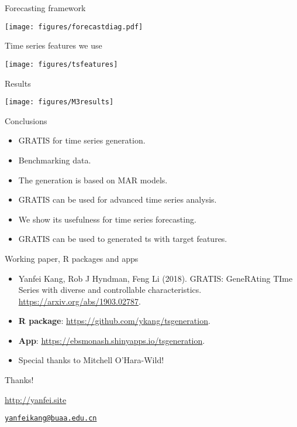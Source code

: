 \documentclass[12pt,ignorenonframetext,compress]{beamer}
\providecommand{\tightlist}{%
  \setlength{\itemsep}{0pt}\setlength{\parskip}{0pt}}
\begin{document}
\begin{frame}{Forecasting framework}
\protect\hypertarget{application-to-m3}{}

\centerline{\texttt{[image: figures/forecastdiag.pdf]}}

\end{frame}

\begin{frame}{Time series features we use}
\protect\hypertarget{time-series-features-we-use}{}

\centerline{\texttt{[image: figures/tsfeatures]}}

\end{frame}



\begin{frame}{Results}
\protect\hypertarget{results}{}

\centerline{\texttt{[image: figures/M3results]}}

\end{frame}

\begin{frame}{Conclusions}
\protect\hypertarget{conclusions}{}

\begin{itemize}
\tightlist
\item
  GRATIS for time series generation.
\item
  Benchmarking data.
\item
  The generation is based on MAR models.
\item
  GRATIS can be used for advanced time series analysis.
\item
  We show its usefulness for time series forecasting.
\item
  GRATIS can be used to generated ts with target features.
\end{itemize}

\end{frame}


\begin{frame}{Working paper, R packages and apps}
\protect\hypertarget{r-packages-and-apps}{}

\begin{itemize}
\tightlist
\item
  Yanfei Kang, Rob J Hyndman, Feng Li (2018). GRATIS: GeneRAting TIme
  Series with diverse and controllable characteristics.
  \url{https://arxiv.org/abs/1903.02787}.

\item
  \textbf{R package}: \url{https://github.com/ykang/tsgeneration}.
\item
  \textbf{App}: \url{https://ebsmonash.shinyapps.io/tsgeneration}.
\item
  Special thanks to Mitchell O'Hara-Wild!
\end{itemize}

\end{frame}




\begin{frame}{Thanks!}
\protect\hypertarget{thanks}{}

\Large \url{http://yanfei.site}

\Large \href{mailto:yanfeikang@buaa.edu.cn}{\nolinkurl{yanfeikang@buaa.edu.cn}}

\end{frame}
\end{document}
